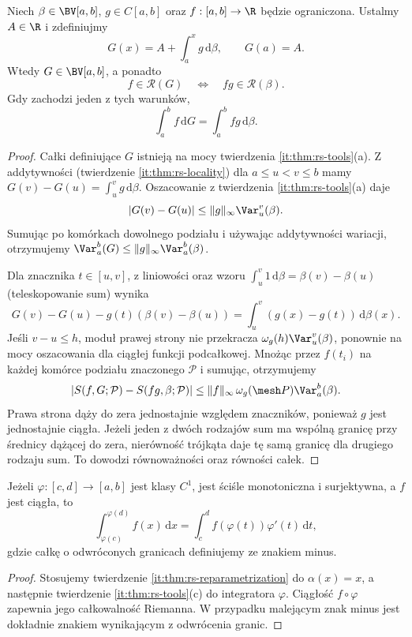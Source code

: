 \begin{twierdzenie}\label{it:thm:rs-integrator-substitution}
Niech $\beta\in\BV[a,b]$, $g\in C[a,b]$ oraz $f:[a,b]\to\R$
będzie ograniczona. Ustalmy $A\in\R$ i zdefiniujmy
\[
 G(x)=A+\int_a^x g\,\mathrm d\beta,\qquad G(a)=A.
\]
Wtedy $G\in\BV[a,b]$, a ponadto
\[
 f\in\mathcal R(G)\quad\Longleftrightarrow\quad
 fg\in\mathcal R(\beta).
\]
Gdy zachodzi jeden z tych warunków,
\[
 \int_a^b f\,\mathrm dG=\int_a^b fg\,\mathrm d\beta.
\]
\end{twierdzenie}
\begin{proof}
Całki definiujące $G$ istnieją na mocy twierdzenia
\ref{it:thm:rs-tools}(a). Z addytywności
(twierdzenie \ref{it:thm:rs-locality}) dla $a\le u<v\le b$ mamy
$G(v)-G(u)=\int_u^v g\,\mathrm d\beta$. Oszacowanie z twierdzenia
\ref{it:thm:rs-tools}(a) daje
\[
 |G(v)-G(u)|\le\|g\|_\infty\Var_u^v(\beta).
\]
Sumując po komórkach dowolnego podziału i używając addytywności
wariacji, otrzymujemy $\Var_a^b(G)\le\|g\|_\infty\Var_a^b(\beta)$.

Dla znacznika $t\in[u,v]$, z liniowości oraz wzoru
$\int_u^v 1\,\mathrm d\beta=\beta(v)-\beta(u)$ (teleskopowanie sum)
wynika
\[
 G(v)-G(u)-g(t)(\beta(v)-\beta(u))
 =\int_u^v(g(x)-g(t))\,\mathrm d\beta(x).
\]
Jeśli $v-u\le h$, moduł prawej strony nie przekracza
$\omega_g(h)\Var_u^v(\beta)$, ponownie na mocy oszacowania
dla ciągłej funkcji podcałkowej. Mnożąc przez $f(t_i)$ na
każdej komórce podziału znaczonego $\mathcal P$ i sumując,
otrzymujemy
\[
 |S(f,G;\mathcal P)-S(fg,\beta;\mathcal P)|
 \le \|f\|_\infty\,\omega_g(\mesh P)\Var_a^b(\beta).
\]
Prawa strona dąży do zera jednostajnie względem znaczników,
ponieważ $g$ jest jednostajnie ciągła. Jeżeli jeden z dwóch
rodzajów sum ma wspólną granicę przy średnicy dążącej do zera,
nierówność trójkąta daje tę samą granicę dla drugiego rodzaju sum.
To dowodzi równoważności oraz równości całek.
\end{proof}

\begin{wniosek}\label{it:cor:rs-classical-substitution}
Jeżeli $\varphi:[c,d]\to[a,b]$ jest klasy $C^1$, jest ściśle
monotoniczna i surjektywna, a $f$ jest ciągła, to
\[
 \int_{\varphi(c)}^{\varphi(d)} f(x)\,\mathrm dx
 =\int_c^d f(\varphi(t))\varphi'(t)\,\mathrm dt,
\]
gdzie całkę o odwróconych granicach definiujemy ze znakiem minus.
\end{wniosek}
\begin{proof}
Stosujemy twierdzenie \ref{it:thm:rs-reparametrization}
do $\alpha(x)=x$, a następnie twierdzenie
\ref{it:thm:rs-tools}(c) do integratora $\varphi$.
Ciągłość $f\circ\varphi$ zapewnia jego całkowalność Riemanna.
W przypadku malejącym znak minus jest dokładnie znakiem
wynikającym z odwrócenia granic.
\end{proof}

